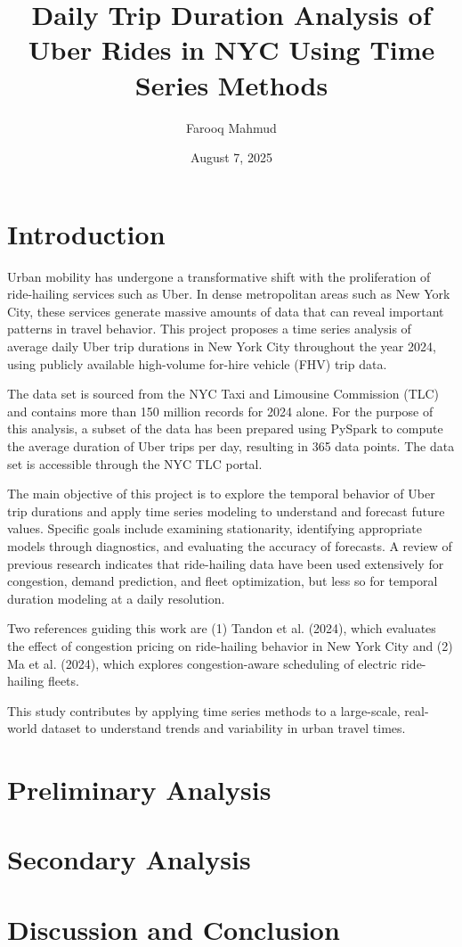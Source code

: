 \documentclass{article}
\title{Daily Trip Duration Analysis of Uber Rides in NYC Using Time Series Methods }
\author{
    Farooq Mahmud
}
\date{August 7, 2025}
\begin{document}
\maketitle

\section{Introduction}
Urban mobility has undergone a transformative shift with the proliferation of ride-hailing services such as Uber. In dense metropolitan areas such as New York City, these services generate massive amounts of data that can reveal important patterns in travel behavior. This project proposes a time series analysis of average daily Uber trip durations in New York City throughout the year 2024, using publicly available high-volume for-hire vehicle (FHV) trip data.

The data set is sourced from the NYC Taxi and Limousine Commission (TLC) and contains more than 150 million records for 2024 alone. For the purpose of this analysis, a subset of the data has been prepared using PySpark to compute the average duration of Uber trips per day, resulting in 365 data points. The data set is accessible through the NYC TLC portal\cite{nyctlc2024}.

The main objective of this project is to explore the temporal behavior of Uber trip durations and apply time series modeling to understand and forecast future values. Specific goals include examining stationarity, identifying appropriate models through diagnostics, and evaluating the accuracy of forecasts. A review of previous research indicates that ride-hailing data have been used extensively for congestion, demand prediction, and fleet optimization, but less so for temporal duration modeling at a daily resolution.

Two references guiding this work are (1) Tandon et al. (2024), which evaluates the effect of congestion pricing on ride-hailing behavior in New York City\cite{tandon2024congestion} and (2) Ma et al. (2024), which explores congestion-aware scheduling of electric ride-hailing fleets\cite{ma2024congestion}.

This study contributes by applying time series methods to a large-scale, real-world dataset to understand trends and variability in urban travel times.

\section {Preliminary Analysis}
\section {Secondary Analysis}
\section {Discussion and Conclusion}



\end{document}
